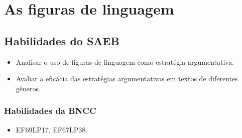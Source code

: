 
\chapter{As figuras de linguagem}

\section*{Habilidades do SAEB}
\begin{itemize}
\item Analisar o uso de figuras de linguagem como
estratégia argumentativa.
\item Avaliar a eficácia das estratégias
argumentativas em textos de diferentes gêneros.
\end{itemize}

\subsection*{Habilidades da BNCC} 
\begin{itemize}
\item EF69LP17, EF67LP38.
\end{itemize}

